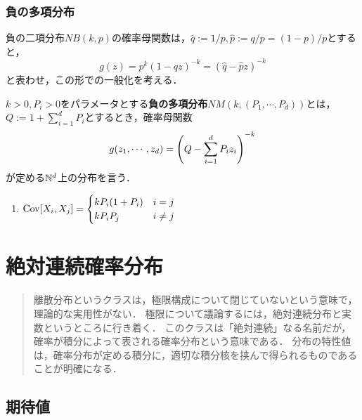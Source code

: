 \documentclass[uplatex,dvipdfmx]{jsreport}
\begin{document}
\subsection{負の多項分布}

\begin{tcolorbox}[colframe=ForestGreen, colback=ForestGreen!10!white,breakable,colbacktitle=ForestGreen!40!white,coltitle=black,fonttitle=\bfseries\sffamily,
title=]
    負の二項分布$NB(k,p)$の確率母関数は，$\hat{q}:=1/p,\hat{p}:=q/p=(1-p)/p$とすると，
    \[g(z)=p^k(1-qz)^{-k}=(\hat{q}-\hat{p}z)^{-k}\]
    と表わせ，この形での一般化を考える．
\end{tcolorbox}

\begin{definition}
    $k>0,P_i>0$をパラメータとする\textbf{負の多項分布}$NM(k,(P_1,\cdots,P_d))$とは，$Q:=1+\sum^d_{i=1}P_i$とするとき，確率母関数
    \[g(z_1,\cdots,z_d)=\left(Q-\sum^d_{i=1}P_iz_i\right)^{-k}\]
    が定める$\mathbb{N}^d$上の分布を言う．
\end{definition}

\begin{proposition}[確率母関数の微分からわかること]\mbox{}
    \begin{enumerate}
        \item $\mathrm{Cov}[X_i,X_j]=\begin{cases}
            kP_i(1+P_i)&i=j\\
            kP_iP_j&i\ne j
        \end{cases}$
    \end{enumerate}
\end{proposition}

\chapter{絶対連続確率分布}

\begin{quotation}
    離散分布というクラスは，極限構成について閉じていないという意味で，理論的な実用性がない．
    極限について議論するには，絶対連続分布と実数というところに行き着く．
    このクラスは「絶対連続」なる名前だが，確率が積分によって表される確率分布という意味である．
    分布の特性値は，確率分布が定める積分に，適切な積分核を挟んで得られるものであることが明確になる．
\end{quotation}

\section{期待値}
\end{document}
